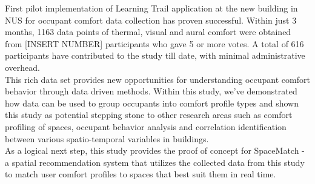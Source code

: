 
First pilot implementation of Learning Trail application at the new building in NUS for occupant comfort data collection has proven successful. Within just 3 months, 1163 data points of thermal, visual and aural comfort were obtained from [INSERT NUMBER] participants who gave 5 or more votes. A total of 616 participants have contributed to the study till date, with minimal administrative overhead.\\

This rich data set provides new opportunities for understanding occupant comfort behavior through data driven methods. Within this study, we've demonstrated how data can be used to group occupants into comfort profile types and shown this study as potential stepping stone to other research areas such as comfort profiling of spaces, occupant behavior analysis and correlation identification between various spatio-temporal variables in buildings.\\

As a logical next step, this study provides the proof of concept for SpaceMatch - a spatial recommendation system that utilizes the collected data from this study to match user comfort profiles to spaces that best suit them in real time.
